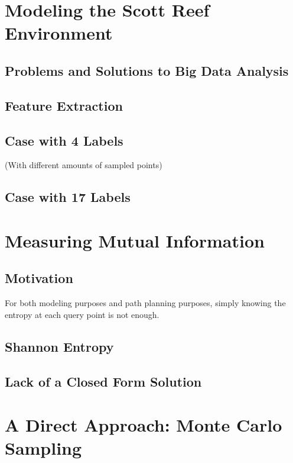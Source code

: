 	\section{Modeling the Scott Reef Environment}
	
		\subsection{Problems and Solutions to Big Data Analysis}
		
		\subsection{Feature Extraction}
		
		\subsection{Case with 4 Labels}
		
			(With different amounts of sampled points)
			
		\subsection{Case with 17 Labels}
		
	\section{Measuring Mutual Information}
	
		\subsection{Motivation}
			For both modeling purposes and path planning purposes, simply knowing the entropy at each query point is not enough. 
			
		\subsection{Shannon Entropy}
		
		\subsection{Lack of a Closed Form Solution}
		
	\section{A Direct Approach: Monte Carlo Sampling}
		
